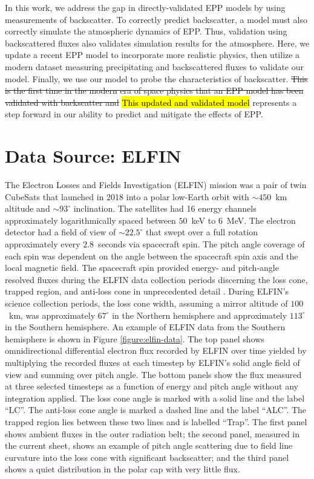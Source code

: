\documentclass[draft]{agujournal2019}
\newcommand{\mathdeg}{^\circ}
\begin{document}
In this work, we address the gap in directly-validated EPP models by using measurements of backscatter. To correctly predict backscatter, a model must also correctly simulate the atmospheric dynamics of EPP. Thus, validation using backscattered fluxes also validates simulation results for the atmosphere. Here, we update a recent EPP model to incorporate more realistic physics, then utilize a modern dataset measuring precipitating and backscattered fluxes to validate our model. Finally, we use our model to probe the characteristics of backscatter. \st{This is the first time in the modern era of space physics that an EPP model has been validated with backscatter and} \hl{This updated and validated model} represents a step forward in our ability to predict and mitigate the effects of EPP.

\section{Data Source: ELFIN}
The Electron Losses and Fields Investigation (ELFIN) mission was a pair of twin CubeSats that launched in 2018 into a polar low-Earth orbit with $\sim450$~km altitude and $\sim 93\mathdeg$ inclination. The satellites had 16 energy channels approximately logarithmically spaced between $50$~keV to $6$~MeV. The electron detector had a field of view of $\sim 22.5\mathdeg$ that swept over a full rotation approximately every $2.8$~seconds via spacecraft spin. The pitch angle coverage of each spin was dependent on the angle between the spacecraft spin axis and the local magnetic field. The spacecraft spin provided energy- and pitch-angle resolved fluxes during the ELFIN data collection periods discerning the loss cone, trapped region, and anti-loss cone in unprecedented detail \cite{angelopoulos2020, tsai2025}. During ELFIN's science collection periods, the loss cone width, assuming a mirror altitude of $100$~km, was approximately $67\mathdeg$ in the Northern hemisphere and approximately $113\mathdeg$ in the Southern hemisphere. An example of ELFIN data from the Southern hemisphere is shown in Figure \ref{figure:elfin-data}. The top panel shows omnidirectional differential electron flux recorded by ELFIN over time yielded by multiplying the recorded fluxes at each timestep by ELFIN's solid angle field of view and summing over pitch angle. The bottom panels show the flux measured at three selected timesteps as a function of energy and pitch angle without any integration applied. The loss cone angle is marked with a solid line and the label ``LC''. The anti-loss cone angle is marked a dashed line and the label ``ALC''. The trapped region lies between these two lines and is labelled ``Trap''. The first panel shows ambient fluxes in the outer radiation belt; the second panel, measured in the current sheet, shows an example of pitch angle scattering due to field line curvature into the loss cone with significant backscatter; and the third panel shows a quiet distribution in the polar cap with very little flux.
\end{document}
